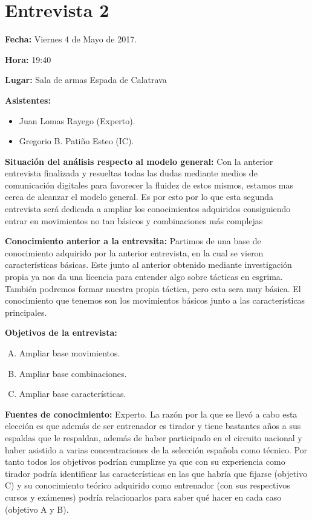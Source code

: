 \section{Entrevista 2}

\textbf{Fecha:} Viernes 4 de Mayo de 2017.

\textbf{Hora:} 19:40

\textbf{Lugar:} Sala de armas Espada de Calatrava

\textbf{Asistentes:}
  \begin{itemize}
    \item Juan Lomas Rayego (Experto).
    \item Gregorio B. Patiño Esteo (IC).
  \end{itemize}

\textbf{Situación del análisis respecto al modelo general:} Con la anterior entrevista finalizada
y resueltas todas las dudas mediante medios de comunicación digitales para favorecer la fluidez
de estos mismos, estamos mas cerca de alcanzar el modelo general. Es por esto por lo que esta segunda
entrevista será dedicada a ampliar los conocimientos adquiridos consiguiendo entrar en movimientos
no tan básicos y combinaciones más complejas

\textbf{Conocimiento anterior a la entrevsita:} Partimos de una base de conocimiento adquirido
por la anterior entrevista, en la cual se vieron características básicas. Este junto al anterior
obtenido mediante investigación propia ya nos da una licencia para entender algo sobre tácticas
en esgrima. También podremos formar nuestra propia táctica, pero esta sera muy básica. El conocimiento
que tenemos son los movimientos básicos junto a las características principales.

\textbf{Objetivos de la entrevista:}
  \begin{enumerate}[(A)]
    \item Ampliar base movimientos.
    \item Ampliar base combinaciones.
    \item Ampliar base características.
  \end{enumerate}

\textbf{Fuentes de conocimiento:} Experto.
La razón por la que se llevó a cabo esta elección es que además de ser entrenador es tirador y
tiene bastantes años a sus espaldas que le respaldan, además de haber participado en el circuito
nacional y haber asistido a varias concentraciones de la selección española como técnico. Por
tanto todos los objetivos podrían cumplirse ya que con su experiencia como tirador podría
identificar las características en las que habría que fijarse (objetivo C) y su conocimiento teórico
adquirido como entrenador (con sus respectivos cursos y exámenes) podría relacionarlos para
saber qué hacer en cada caso (objetivo A y B).

